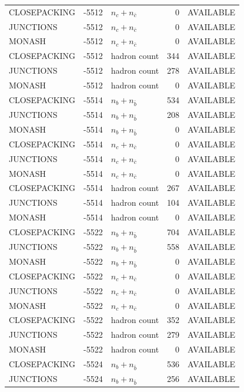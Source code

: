 \begin{landscape}
\begin{longtable}{@{}lrlrl@{}}
CLOSEPACKING & -5512 & $n_c+n_{\bar c}$ & \num{0} & AVAILABLE \\
JUNCTIONS & -5512 & $n_c+n_{\bar c}$ & \num{0} & AVAILABLE \\
MONASH & -5512 & $n_c+n_{\bar c}$ & \num{0} & AVAILABLE \\
CLOSEPACKING & -5512 & hadron count & \num{344} & AVAILABLE \\
JUNCTIONS & -5512 & hadron count & \num{278} & AVAILABLE \\
MONASH & -5512 & hadron count & \num{0} & AVAILABLE \\
CLOSEPACKING & -5514 & $n_b+n_{\bar b}$ & \num{534} & AVAILABLE \\
JUNCTIONS & -5514 & $n_b+n_{\bar b}$ & \num{208} & AVAILABLE \\
MONASH & -5514 & $n_b+n_{\bar b}$ & \num{0} & AVAILABLE \\
CLOSEPACKING & -5514 & $n_c+n_{\bar c}$ & \num{0} & AVAILABLE \\
JUNCTIONS & -5514 & $n_c+n_{\bar c}$ & \num{0} & AVAILABLE \\
MONASH & -5514 & $n_c+n_{\bar c}$ & \num{0} & AVAILABLE \\
CLOSEPACKING & -5514 & hadron count & \num{267} & AVAILABLE \\
JUNCTIONS & -5514 & hadron count & \num{104} & AVAILABLE \\
MONASH & -5514 & hadron count & \num{0} & AVAILABLE \\
CLOSEPACKING & -5522 & $n_b+n_{\bar b}$ & \num{704} & AVAILABLE \\
JUNCTIONS & -5522 & $n_b+n_{\bar b}$ & \num{558} & AVAILABLE \\
MONASH & -5522 & $n_b+n_{\bar b}$ & \num{0} & AVAILABLE \\
CLOSEPACKING & -5522 & $n_c+n_{\bar c}$ & \num{0} & AVAILABLE \\
JUNCTIONS & -5522 & $n_c+n_{\bar c}$ & \num{0} & AVAILABLE \\
MONASH & -5522 & $n_c+n_{\bar c}$ & \num{0} & AVAILABLE \\
CLOSEPACKING & -5522 & hadron count & \num{352} & AVAILABLE \\
JUNCTIONS & -5522 & hadron count & \num{279} & AVAILABLE \\
MONASH & -5522 & hadron count & \num{0} & AVAILABLE \\
CLOSEPACKING & -5524 & $n_b+n_{\bar b}$ & \num{536} & AVAILABLE \\
JUNCTIONS & -5524 & $n_b+n_{\bar b}$ & \num{256} & AVAILABLE \\

\end{longtable}
\end{landscape}
